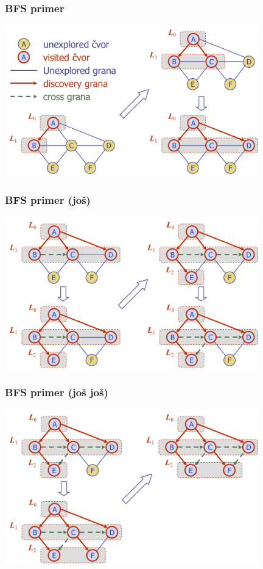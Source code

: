 \documentclass[compress,aspectratio=169]{beamer}
\begin{document}
\begin{frame}[fragile]
  \frametitle{BFS primer}
  \begin{center}
    \includegraphics[width=11cm]{asp-14-pic22.png}
  \end{center}
\end{frame}

\begin{frame}[fragile]
  \frametitle{BFS primer (još)}
  \begin{center}
    \includegraphics[width=11cm]{asp-14-pic23.png}
  \end{center}
\end{frame}

\begin{frame}[fragile]
  \frametitle{BFS primer (još još)}
  \begin{center}
    \includegraphics[width=11cm]{asp-14-pic24.png}
  \end{center}
\end{frame}
\end{document}
